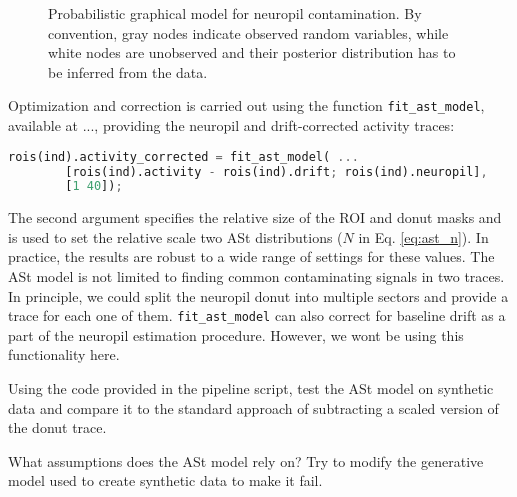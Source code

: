 \documentclass[a4paper]{report}
\newcommand{\nexercise}[0]{\arabic{exercises}\addtocounter{exercises}{1}}
\begin{document}
\begin{figure}[b]
  \centering
  \caption{Probabilistic graphical model for neuropil contamination. By convention, gray nodes indicate observed random variables, while white nodes are unobserved and their posterior distribution has to be inferred from the data.}
  \label{fig:neuropil}
\end{figure}

Optimization and correction is carried out using the function \texttt{fit\_ast\_model}, available at ..., providing the neuropil and drift-corrected activity traces: 
\begin{lstlisting}[language=Octave]
rois(ind).activity_corrected = fit_ast_model( ...
        [rois(ind).activity - rois(ind).drift; rois(ind).neuropil], 
        [1 40]);
\end{lstlisting}

The second argument specifies the relative size of the ROI and donut masks and is used to set the relative scale two ASt distributions ($N$ in Eq. \ref{eq:ast_n}). 
In practice, the results are robust to a wide range of settings for these values. 
The ASt model is not limited to finding common contaminating signals in two traces. 
In principle, we could split the neuropil donut into multiple sectors and provide a trace for each one of them.
\texttt{fit\_ast\_model} can also correct for baseline drift as a part of the neuropil estimation procedure. However, we wont be using this functionality here.

\begin{exercisebox}[frametitle={Exercise \nexercise: Test ASt model on synthetic data}]
Using the code provided in the pipeline script, test the ASt model on synthetic data and compare it to the standard approach of subtracting a scaled version of the donut trace.

What assumptions does the ASt model rely on? Try to modify the generative model used to create synthetic data to make it fail.
\end{exercisebox}
\end{document}
